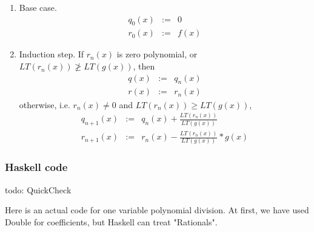 \documentclass[11pt]{book}
\begin{document}
\begin{enumerate}
\item Base case.
\begin{eqnarray}
q_0(x) &:=& 0 \\
r_0(x) &:=& f(x)
\end{eqnarray}

\item Induction step.
If $r_n(x)$ is zero polynomial, or $LT\left(r_n(x) \right) \not\geq LT\left( g(x)\right)$,
then
\begin{eqnarray}
q(x) &:=& q_n(x) \\
r(x) &:=& r_n(x)
\end{eqnarray}
otherwise, i.e. $r_n(x) \neq 0$ and $LT\left(r_n(x) \right) \geq LT\left( g(x)\right)$,
\begin{eqnarray}
q_{n+1}(x) &:=& q_n(x) + \frac{LT\left( r_n(x) \right)}{LT\left( g(x) \right)} \\
r_{n+1}(x) &:=& r_n(x) - \frac{LT\left( r_n(x) \right)}{LT\left( g(x) \right)}*g(x) 
\end{eqnarray}

\end{enumerate}


\subsubsection{Haskell code}
todo: QuickCheck

Here is an actual code for one variable polynomial division.
At first, we have used Double for coefficients, but Haskell can treat "Rationals".
\end{document}
